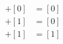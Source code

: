 \documentclass[preview]{standalone}
\begin{document}
\begin{align*}
[0] + [0] &= [0] \\[1] + [1] &= [0] \\[0] + [1] &= [1]
\end{align*}
\end{document}
